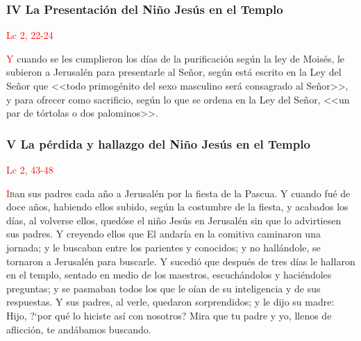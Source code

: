 \documentclass[10pt,twoside]{book}
\begin{document}
\vspace{0.5em}



\vspace{1.5em}

\noindent\subsubsection*{IV La Presentación del Niño Jesús en el Templo}

\vspace{-0.5em}

\hfill\textcolor{red}{Lc 2, 22-24}

\lettrine[lines=2]{\textcolor{red}{Y}}\space{} cuando se les cumplieron los días de la purificación según la ley de Moisés, le subieron a Jerusalén para presentarle al Señor,
según está escrito en la Ley del Señor que <<todo primogénito del sexo masculino será consagrado al Señor>>, y para ofrecer como sacrificio,
según lo que se ordena en la Ley del Señor, <<un par de tórtolas o dos palominos>>.

\vspace{0.5em}



\noindent\subsubsection*{V La pérdida y hallazgo del Niño Jesús en el Templo}

\vspace{-0.5em}

\hfill\textcolor{red}{Lc 2, 43-48}

\lettrine[lines=2]{\textcolor{red}{I}}ban sus padres cada año a Jerusalén por la fiesta de la Pascua. Y cuando fué de doce años, habiendo ellos subido, según la costumbre de la fiesta,
y acabados los días, al volverse ellos, quedóse el niño Jesús en Jerusalén sin que lo advirtiesen sus padres. Y creyendo ellos que El andaría en la comitiva caminaron una jornada; y le
buscaban entre los parientes y conocidos; y no hallándole, se tornaron a Jerusalén para buscarle. Y sucedió que después de tres días le hallaron en el templo,
sentado en medio de los maestros, escuchándolos y haciéndoles preguntas; y se pasmaban todos los que le oían de su inteligencia y de sus respuestas.
Y sus padres, al verle, quedaron sorprendidos; y le dijo su madre: Hijo, {?`}por qué lo hiciste así con nosotros? Mira que tu padre y yo, llenos de aflicción, 
te andábamos buscando.
\end{document}
